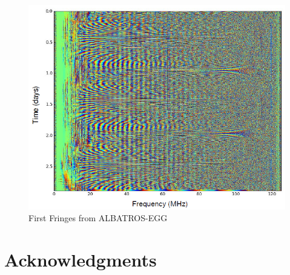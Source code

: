 \documentclass{ws-jai}
\begin{document}
\begin{figure}[ht!]
	\begin{center}
		\includegraphics[width=0.7\linewidth]{Figures/First-fringes-of-ALBATROS-EGG.PNG}
		\caption{First Fringes from ALBATROS-EGG}
		\label{Fig:fringes}
	\end{center}
\end{figure}

	
\section*{Acknowledgments}
\end{document}
